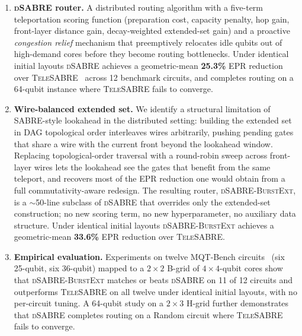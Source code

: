 \documentclass[conference]{IEEEtran}
\newcommand{\dSABRE}{\textsc{dSABRE}}
\newcommand{\BurstExt}{\textsc{dSABRE-BurstExt}}
\newcommand{\TeleSABRE}{\textsc{TeleSABRE}}
\newcommand{\SABRE}{\textsc{SABRE}}
\begin{document}
\begin{enumerate}
  \item \textbf{\dSABRE{} router.}
    A distributed routing algorithm with a five-term teleportation scoring
    function (preparation cost, capacity penalty, hop gain, front-layer
    distance gain, decay-weighted extended-set gain) and a proactive
    \emph{congestion relief} mechanism that preemptively relocates idle
    qubits out of high-demand cores before they become routing bottlenecks.
    Under identical initial layouts \dSABRE{} achieves a geometric-mean
    \textbf{25.3\%} EPR reduction over \TeleSABRE{}~\cite{russo2025telesabre}
    across 12 benchmark circuits, and completes routing on a 64-qubit
    instance where \TeleSABRE{} fails to converge.

  \item \textbf{Wire-balanced extended set.}
    We identify a structural limitation of \SABRE{}-style lookahead in the
    distributed setting: building the extended set in DAG topological order
    interleaves wires arbitrarily, pushing pending gates that share a wire
    with the current front beyond the lookahead window.
    Replacing topological-order traversal with a round-robin sweep across
    front-layer wires lets the lookahead see the gates that benefit from
    the same teleport, and recovers most of the EPR reduction one would
    obtain from a full commutativity-aware redesign.
    The resulting router, \BurstExt{}, is a $\sim$50-line subclass of
    \dSABRE{} that overrides only the extended-set construction; no new
    scoring term, no new hyperparameter, no auxiliary data structure.
    Under identical initial layouts \BurstExt{} achieves a geometric-mean
    \textbf{33.6\%} EPR reduction over \TeleSABRE{}.

  \item \textbf{Empirical evaluation.}
    Experiments on twelve MQT-Bench circuits~\cite{quetschlich2023mqtbench}
    (six 25-qubit, six 36-qubit) mapped to a $2\!\times\!2$ B-grid of
    $4\!\times\!4$-qubit cores show that \BurstExt{} matches or beats
    \dSABRE{} on 11 of 12 circuits and outperforms \TeleSABRE{} on all
    twelve under identical initial layouts, with no per-circuit tuning.
    A 64-qubit study on a $2\!\times\!3$ H-grid further demonstrates that
    \dSABRE{} completes routing on a Random circuit where \TeleSABRE{}
    fails to converge.
\end{enumerate}

\end{document}
